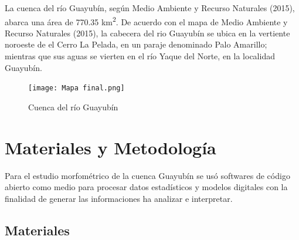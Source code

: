 \documentclass[11pt,]{article}
\begin{document}
La cuenca del río Guayubín, según Medio Ambiente y Recurso Naturales
(2015), abarca una área de 770.35 km\textsuperscript{2}. De acuerdo con
el mapa de Medio Ambiente y Recurso Naturales (2015), la cabecera del
rio Guayubín se ubica en la vertiente noroeste de el Cerro La Pelada, en
un paraje denominado Palo Amarillo; mientras que sus aguas se vierten en
el río Yaque del Norte, en la localidad Guayubín.

\begin{figure}
\centering
\texttt{[image: Mapa final.png]}
\caption{Cuenca del río Guayubín\label{mapacuenca}}
\end{figure}

\section{Materiales y Metodología}\label{materiales-y-metodologuxeda}

Para el estudio morfométrico de la cuenca Guayubín se usó softwares de
código abierto como medio para procesar datos estadísticos y modelos
digitales con la finalidad de generar las informaciones ha analizar e
interpretar.

\subsection{Materiales}\label{materiales}
\end{document}
